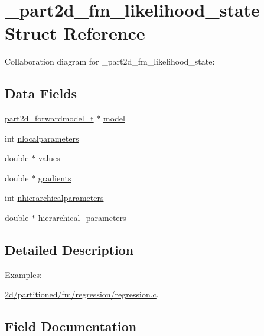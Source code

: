 \hypertarget{struct__part2d__fm__likelihood__state}{}\section{\+\_\+part2d\+\_\+fm\+\_\+likelihood\+\_\+state Struct Reference}
\label{struct__part2d__fm__likelihood__state}


Collaboration diagram for \+\_\+part2d\+\_\+fm\+\_\+likelihood\+\_\+state\+:
\subsection*{Data Fields}
\begin{DoxyCompactItemize}
\item 
\hyperlink{part2d__forwardmodel_8h_abe003f55322475b0dd158343b3916a13}{part2d\+\_\+forwardmodel\+\_\+t} $\ast$ \hyperlink{struct__part2d__fm__likelihood__state_ac9e0cd9ecd351409ce9a0dbff9e2cd78}{model}
\item 
int \hyperlink{struct__part2d__fm__likelihood__state_a8553534c5dbc507802ec421b220e9588}{nlocalparameters}
\item 
double $\ast$ \hyperlink{struct__part2d__fm__likelihood__state_a7bd797c6f8fce53adba2e31d6845612f}{values}
\item 
double $\ast$ \hyperlink{struct__part2d__fm__likelihood__state_adaee9d34479641bd0dfeacaa06512978}{gradients}
\item 
int \hyperlink{struct__part2d__fm__likelihood__state_a8ac576395a4ad97424e8f0c74c423c82}{nhierarchicalparameters}
\item 
double $\ast$ \hyperlink{struct__part2d__fm__likelihood__state_a074fb00b92c2dc794a63cd5d1882cf79}{hierarchical\+\_\+parameters}
\end{DoxyCompactItemize}


\subsection{Detailed Description}
\begin{Desc}
\item[Examples\+: ]\par
\hyperlink{2d_2partitioned_2fm_2regression_2regression_8c-example}{2d/partitioned/fm/regression/regression.\+c}.\end{Desc}


\subsection{Field Documentation}
